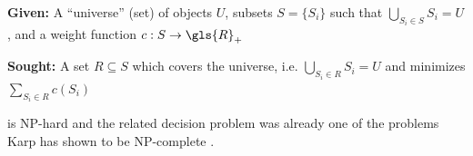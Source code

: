 
\begin{problem}\label{prob:mwsc}
  \hfill
  \begin{labeling}{\hspace{4em}}
    \item[\textbf{Given:}]
      A ``universe'' (set) of objects \(U\), 
      subsets \(S = \{S_i\}\)
      such that \(\bigcup\limits_{S_i \in S} S_i = U\),
      and a weight function \(c : S \to \gls{R}_+\)
    \item[\textbf{Sought:}]
      A set \(R \subseteq S\)
      which covers the universe, i.e. 
      \(\bigcup\limits_{S_i \in R} S_i = U\)
      and minimizes \(\sum\limits_{S_i \in R} c(S_i)\)
  \end{labeling}
\end{problem}

 is NP-hard \cite{set_cover} and the related decision 
problem was already one of the problems Karp has shown to be 
NP-complete \cite{karp_np_complete}.


